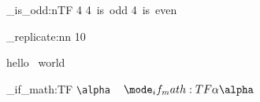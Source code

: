 \documentclass{article}
\begin{document}
\ExplSyntaxOn
\if_is_odd:nTF { 4 } { 4~is~odd } { 4~is~even }\par

\prg_replicate:nn {10}{hello~ world\par }

\newcommand{\cmda}{
  \mode_if_math:TF 
    {\alpha}
    {\texttt{\textbackslash alpha}}
}
\cmda{}~ $\cmda$
\ExplSyntaxOff
\end{document}
